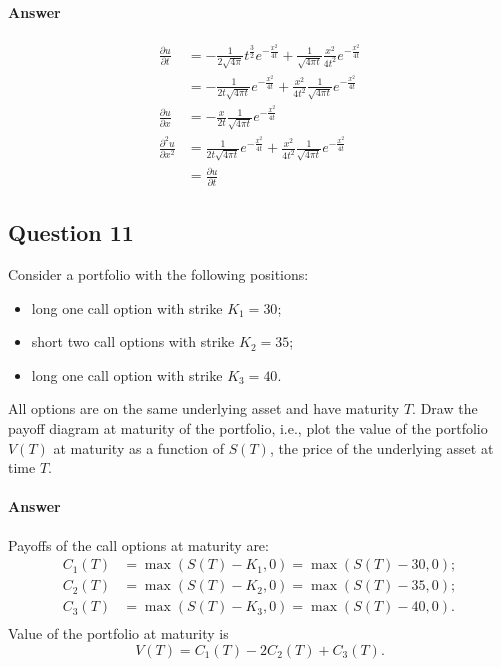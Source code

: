 \paragraph{Answer}
\begin{align*}
    \frac{\partial u}{\partial t}
        &= -\frac{1}{2 \sqrt{4 \pi}} t^{\frac{3}{2}} e^{-\frac{x^2}{4 t}} +
            \frac{1}{\sqrt{4 \pi t}} \frac{x^2}{4 t^2} e^{-\frac{x^2}{4 t}} \\
        &= -\frac{1}{2 t \sqrt{4 \pi t}} e^{-\frac{x^2}{4 t}} +
            \frac{x^2}{4 t^2} \frac{1}{\sqrt{4 \pi t}} e^{-\frac{x^2}{4 t}} \\
    \frac{\partial u}{\partial x}
        &= -\frac{x}{2 t} \frac{1}{\sqrt{4 \pi t}} e^{-\frac{x^2}{4 t}} \\
    \frac{\partial^2 u}{\partial x^2}
        &= \frac{1}{2 t \sqrt{4 \pi t}} e^{-\frac{x^2}{4 t}} +
            \frac{x^2}{4 t^2} \frac{1}{\sqrt{4 \pi t}} e^{-\frac{x^2}{4 t}} \\
        &= \frac{\partial u}{\partial t}
\end{align*}

\subsection{Question 11}
Consider a portfolio with the following positions:
\begin{itemize}
    \item long one call option with strike $ K_1 = 30 $;
    \item short two call options with strike $ K_2 = 35 $;
    \item long one call option with strike $ K_3 = 40 $.
\end{itemize}
All options are on the same underlying asset and have maturity $ T $.
Draw the payoff diagram at maturity of the portfolio, i.e., plot the value of
    the portfolio $ V(T) $ at maturity as a function of $ S(T) $, the price of
    the underlying asset at time $ T $.

\paragraph{Answer}
Payoffs of the call options at maturity are:
\begin{align*}
    C_1(T) &= \max (S(T) - K_1, 0) = \max (S(T) - 30, 0); \\
    C_2(T) &= \max (S(T) - K_2, 0) = \max (S(T) - 35, 0); \\
    C_3(T) &= \max (S(T) - K_3, 0) = \max (S(T) - 40, 0). \\
\end{align*}
Value of the portfolio at maturity is
\begin{equation*}
    V(T) = C_1(T) - 2 C_2(T) + C_3 (T).
\end{equation*}

